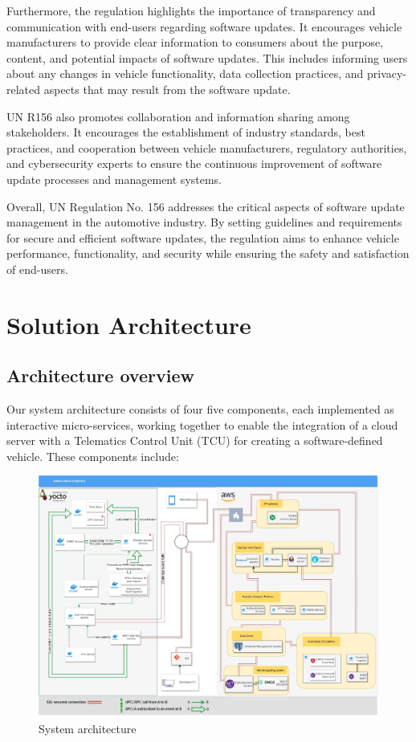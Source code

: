 \documentclass[
12pt,
oneside, 
onehalfspacing, 
nolistspacing, 
parskip, 
chapterinoneline, 
]{AASTCOMPUTER}
\begin{document}
Furthermore, the regulation highlights the importance of transparency and communication with end-users regarding software updates. It encourages vehicle manufacturers to provide clear information to consumers about the purpose, content, and potential impacts of software updates. This includes informing users about any changes in vehicle functionality, data collection practices, and privacy-related aspects that may result from the software update.

UN R156 also promotes collaboration and information sharing among stakeholders. It encourages the establishment of industry standards, best practices, and cooperation between vehicle manufacturers, regulatory authorities, and cybersecurity experts to ensure the continuous improvement of software update processes and management systems.

Overall, UN Regulation No. 156 addresses the critical aspects of software update management in the automotive industry. By setting guidelines and requirements for secure and efficient software updates, the regulation aims to enhance vehicle performance, functionality, and security while ensuring the safety and satisfaction of end-users.
\chapter{Solution Architecture}

\section{Architecture overview}
Our system architecture consists of four five components, each implemented as interactive micro-services, working together to enable the integration of a cloud server with a Telematics Control Unit (TCU) for creating a software-defined vehicle. These components include:


\begin{figure}[!ht]
	\centering
	\includegraphics[scale=0.4]{Figures/Architicture/overview.jpg}
  	\caption{System architecture}
  	\label{fig:System architecture}
\end{figure}
\end{document}
